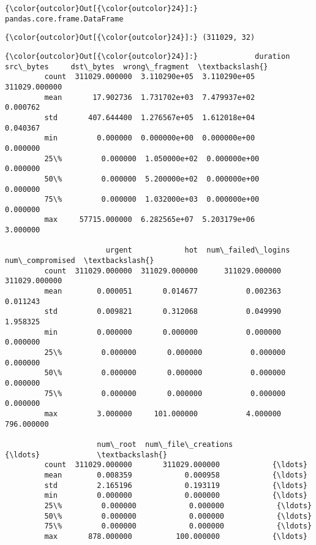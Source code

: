 \documentclass[11pt]{article}
\begin{document}
\begin{Verbatim}[commandchars=\\\{\}]
{\color{outcolor}Out[{\color{outcolor}24}]:} pandas.core.frame.DataFrame
\end{Verbatim}
            
\begin{Verbatim}[commandchars=\\\{\}]
{\color{outcolor}Out[{\color{outcolor}24}]:} (311029, 32)
\end{Verbatim}
            
\begin{Verbatim}[commandchars=\\\{\}]
{\color{outcolor}Out[{\color{outcolor}24}]:}             duration     src\_bytes     dst\_bytes  wrong\_fragment  \textbackslash{}
         count  311029.000000  3.110290e+05  3.110290e+05   311029.000000   
         mean       17.902736  1.731702e+03  7.479937e+02        0.000762   
         std       407.644400  1.276567e+05  1.612018e+04        0.040367   
         min         0.000000  0.000000e+00  0.000000e+00        0.000000   
         25\%         0.000000  1.050000e+02  0.000000e+00        0.000000   
         50\%         0.000000  5.200000e+02  0.000000e+00        0.000000   
         75\%         0.000000  1.032000e+03  0.000000e+00        0.000000   
         max     57715.000000  6.282565e+07  5.203179e+06        3.000000   
         
                       urgent            hot  num\_failed\_logins  num\_compromised  \textbackslash{}
         count  311029.000000  311029.000000      311029.000000    311029.000000   
         mean        0.000051       0.014677           0.002363         0.011243   
         std         0.009821       0.312068           0.049990         1.958325   
         min         0.000000       0.000000           0.000000         0.000000   
         25\%         0.000000       0.000000           0.000000         0.000000   
         50\%         0.000000       0.000000           0.000000         0.000000   
         75\%         0.000000       0.000000           0.000000         0.000000   
         max         3.000000     101.000000           4.000000       796.000000   
         
                     num\_root  num\_file\_creations            {\ldots}             \textbackslash{}
         count  311029.000000       311029.000000            {\ldots}              
         mean        0.008359            0.000958            {\ldots}              
         std         2.165196            0.193119            {\ldots}              
         min         0.000000            0.000000            {\ldots}              
         25\%         0.000000            0.000000            {\ldots}              
         50\%         0.000000            0.000000            {\ldots}              
         75\%         0.000000            0.000000            {\ldots}              
         max       878.000000          100.000000            {\ldots}              
         

\end{Verbatim}
\end{document}
